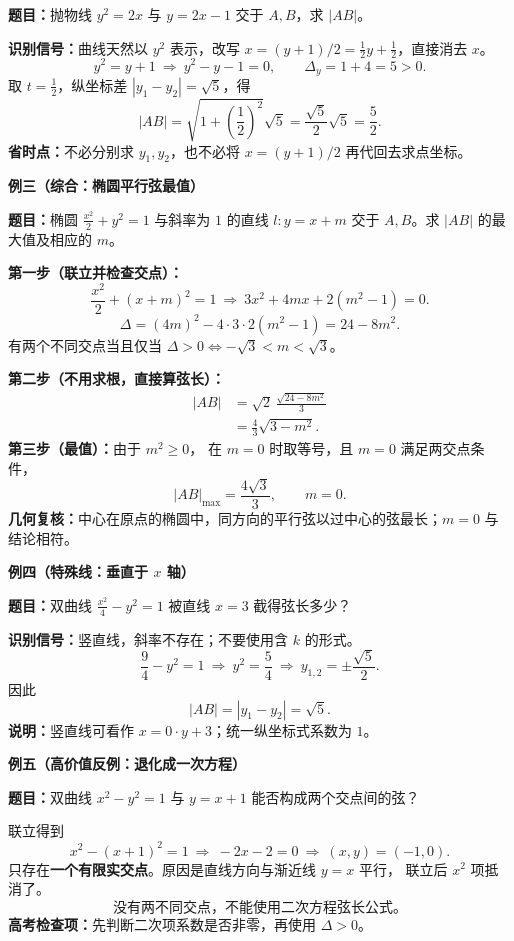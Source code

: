 \begin{examplebox}
\textbf{题目：}抛物线 $y^2=2x$ 与 $y=2x-1$ 交于 $A,B$，求 $|AB|$。

\textbf{识别信号：}曲线天然以 $y^2$ 表示，改写
$x=(y+1)/2=\frac12 y+\frac12$，直接消去 $x$。
\[
 y^2=y+1\ \Longrightarrow\ y^2-y-1=0,
 \qquad \Delta_y=1+4=5>0.
\]
取 $t=\frac12$，纵坐标差
$|y_1-y_2|=\sqrt5$，得
\[
 \boxed{|AB|=\sqrt{1+\left(\frac12\right)^2}\sqrt5
 =\frac{\sqrt5}{2}\sqrt5=\frac52.}
\]
\textbf{省时点：}不必分别求 $y_1,y_2$，也不必将 $x=(y+1)/2$ 再代回去求点坐标。

\medskip
\textbf{\textcolor{CExample}{例三（综合：椭圆平行弦最值）}}

\textbf{题目：}椭圆 $\frac{x^2}{2}+y^2=1$ 与斜率为 $1$ 的直线
$l:y=x+m$ 交于 $A,B$。求 $|AB|$ 的最大值及相应的 $m$。



\textbf{第一步（联立并检查交点）：}
\[
 \frac{x^2}{2}+(x+m)^2=1
 \ \Longrightarrow\ 3x^2+4mx+2(m^2-1)=0.
\]
\[
 \Delta=(4m)^2-4\cdot3\cdot2(m^2-1)
 =24-8m^2.
\]
有两个不同交点当且仅当
$\Delta>0\iff-\sqrt3<m<\sqrt3$。

\textbf{第二步（不用求根，直接算弦长）：}
\[
 \begin{aligned}
 |AB|&=\sqrt2\,\frac{\sqrt{24-8m^2}}3\\
 &=\frac43\sqrt{3-m^2}.
 \end{aligned}
\]
\textbf{第三步（最值）：}由于 $m^2\ge0$，
在 $m=0$ 时取等号，且 $m=0$ 满足两交点条件，
\[
 \boxed{|AB|_{\max}=\frac{4\sqrt3}{3},\qquad m=0.}
\]
\textbf{几何复核：}中心在原点的椭圆中，同方向的平行弦以过中心的弦最长；$m=0$ 与结论相符。

\medskip
\textbf{\textcolor{CExample}{例四（特殊线：垂直于 $x$ 轴）}}

\textbf{题目：}双曲线 $\frac{x^2}{4}-y^2=1$ 被直线 $x=3$ 截得弦长多少？

\textbf{识别信号：}竖直线，斜率不存在；不要使用含 $k$ 的形式。
\[
 \frac94-y^2=1\ \Longrightarrow\ y^2=\frac54
 \ \Longrightarrow\ y_{1,2}=\pm\frac{\sqrt5}{2}.
\]
因此
\[
 \boxed{|AB|=|y_1-y_2|=\sqrt5.}
\]
\textbf{说明：}竖直线可看作 $x=0\cdot y+3$；统一纵坐标式系数为 $1$。

\tcbbreak
\textbf{\textcolor{CExample}{例五（高价值反例：退化成一次方程）}}

\textbf{题目：}双曲线 $x^2-y^2=1$ 与 $y=x+1$ 能否构成两个交点间的弦？



联立得到
\[
 x^2-(x+1)^2=1
 \ \Longrightarrow\ -2x-2=0
 \ \Longrightarrow\ (x,y)=(-1,0).
\]
只存在\textbf{一个有限实交点}。原因是直线方向与渐近线 $y=x$ 平行，
联立后 $x^2$ 项抵消了。
\[
 \boxed{\text{没有两不同交点，不能使用二次方程弦长公式。}}
\]
\textbf{高考检查项：}先判断二次项系数是否非零，再使用 $\Delta>0$。
\end{examplebox}
